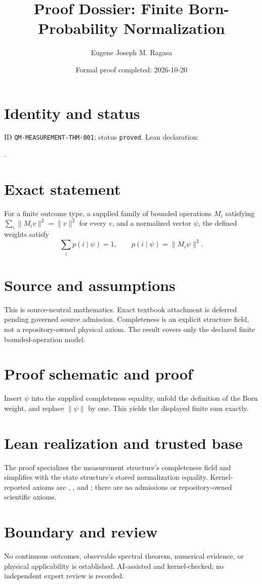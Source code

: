 \documentclass[11pt]{article}
\title{Proof Dossier: Finite Born-Probability Normalization}\author{Eugene Joseph M. Ragasa}\date{Formal proof completed: 2026-10-20}
\begin{document}
\maketitle
\section{Identity and status}
ID \texttt{QM-MEASUREMENT-THM-001}; status \texttt{proved}. Lean declaration:
\par{}.
\section{Exact statement}
For a finite outcome type, a supplied family of bounded operations $M_i$ satisfying
$\sum_i\lVert M_i v\rVert^2=\lVert v\rVert^2$ for every $v$, and a normalized vector
$\psi$, the defined weights satisfy
\[\sum_i p(i\mid\psi)=1,\qquad p(i\mid\psi)=\lVert M_i\psi\rVert^2.\]
\section{Source and assumptions}
This is source-neutral mathematics. Exact textbook attachment is deferred pending governed source
admission. Completeness is an explicit structure field, not a repository-owned physical axiom.
The result covers only the declared finite bounded-operation model.
\section{Proof schematic and proof}
Insert $\psi$ into the supplied completeness equality, unfold the definition of the Born weight,
and replace $\lVert\psi\rVert$ by one. This yields the displayed finite sum exactly.
\section{Lean realization and trusted base}
The proof specializes the measurement structure's completeness field and simplifies with the
state structure's stored normalization equality. Kernel-reported axioms are
, , and ; there are no admissions or
repository-owned scientific axioms.
\section{Boundary and review}
No continuous outcomes, observable spectral theorem, numerical evidence, or physical applicability
is established. AI-assisted and kernel-checked; no independent expert review is recorded.
\end{document}
